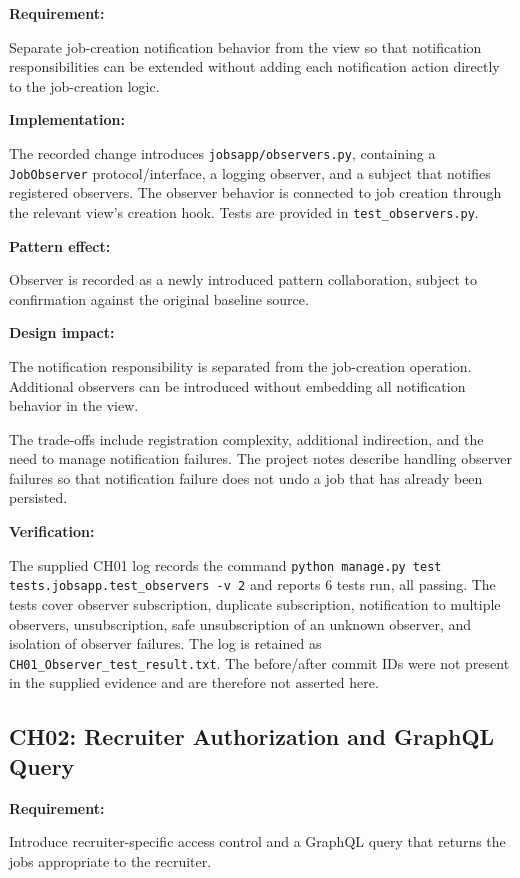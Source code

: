 \documentclass[11pt,a4paper]{article}
\newcommand{\code}[1]{\texttt{#1}}
\begin{document}
\textbf{Requirement:}

Separate job-creation notification behavior from the view
so that notification responsibilities can be extended
without adding each notification action directly to the
job-creation logic.

\textbf{Implementation:}

The recorded change introduces
\code{jobsapp/observers.py}, containing a \code{JobObserver}
protocol/interface, a logging observer, and a subject that
notifies registered observers. The observer behavior is
connected to job creation through the relevant view's
creation hook. Tests are provided in
\code{test\_observers.py}.

\textbf{Pattern effect:}

Observer is recorded as a newly introduced pattern
collaboration, subject to confirmation against the original
baseline source.

\textbf{Design impact:}

The notification responsibility is separated from the
job-creation operation. Additional observers can be
introduced without embedding all notification behavior
in the view.

The trade-offs include registration complexity, additional
indirection, and the need to manage notification failures.
The project notes describe handling observer failures so
that notification failure does not undo a job that has
already been persisted.

\textbf{Verification:}

The supplied CH01 log records the command
\code{python manage.py test tests.jobsapp.test\_observers -v 2}
and reports 6 tests run, all passing. The tests cover observer
subscription, duplicate subscription, notification to multiple observers,
unsubscription, safe unsubscription of an unknown observer, and isolation
of observer failures. The log is retained as
\code{CH01\_Observer\_test\_result.txt}. The before/after commit IDs were
not present in the supplied evidence and are therefore not asserted here.

\subsection{CH02: Recruiter Authorization and GraphQL Query}


\textbf{Requirement:}

Introduce recruiter-specific access control and a GraphQL
query that returns the jobs appropriate to the recruiter.
\end{document}
